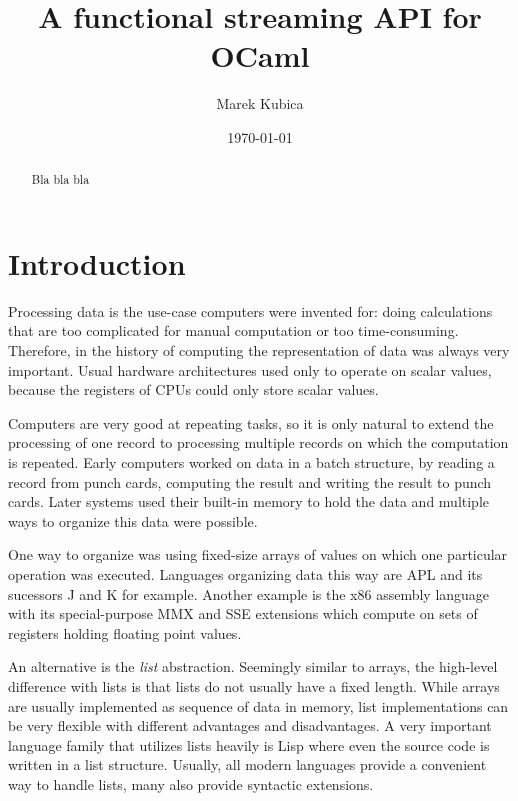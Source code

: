 \documentclass[parskip=half]{scrreprt}
\author{Marek Kubica}
\title{A functional streaming API for OCaml}
\date{\today}
\begin{document}




{}
\begin{abstract}
	\subsubsection*{\abstractname}
	Bla bla bla
\end{abstract}

\tableofcontents

\chapter{Introduction}
\label{sec:intro}

Processing data is the use-case computers were invented for: doing calculations
that are too complicated for manual computation or too time-consuming.
Therefore, in the history of computing the representation of data was always
very important. Usual hardware architectures used only to operate on scalar
values, because the registers of CPUs could only store scalar values.

Computers are very good at repeating tasks, so it is only natural to extend the
processing of one record to processing multiple records on which the
computation is repeated. Early computers worked on data in a batch structure,
by reading a record from punch cards, computing the result and writing the
result to punch cards. Later systems used their built-in memory to hold the
data and multiple ways to organize this data were possible.

One way to organize was using fixed-size arrays of values on which one
particular operation was executed. Languages organizing data this way are APL
and its sucessors J and K for example. Another example is the x86 assembly
language with its special-purpose MMX and SSE extensions which compute on sets
of registers holding floating point values.

An alternative is the \emph{list} abstraction. Seemingly similar to arrays, the
high-level difference with lists is that lists do not usually have a fixed
length. While arrays are usually implemented as sequence of data in memory,
list implementations can be very flexible with different advantages and
disadvantages. A very important language family that utilizes lists heavily is
Lisp where even the source code is written in a list structure. Usually, all
modern languages provide a convenient way to handle lists, many also provide
syntactic extensions.
\end{document}
